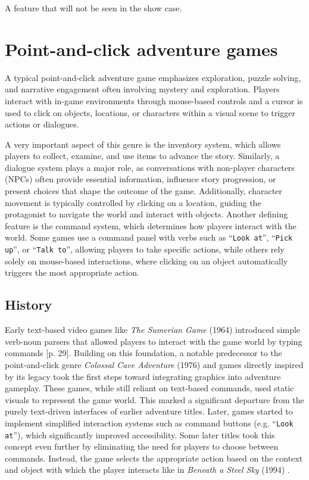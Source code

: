 
\begin{notImplemented}
 \par
\vspace{3mm}
A feature that will not be seen in the show case.
\end{notImplemented}

\section{Point-and-click adventure games}
A typical point-and-click adventure game emphasizes exploration, puzzle solving, and narrative engagement often involving mystery and exploration. Players interact with in-game environments through mouse-based controls and a cursor is used to click on objects, locations, or characters within a visual scene to trigger actions or dialogues. 

A very important aspect of this genre is the inventory system, which allows players to collect, examine, and use items to advance the story. Similarly, a dialogue system plays a major role, as conversations with non-player characters (NPCs) often provide essential information, influence story progression, or present choices that shape the outcome of the game. Additionally, character movement is typically controlled by clicking on a location, guiding the protagonist to navigate the world and interact with objects. Another defining feature is the command system, which determines how players interact with the world. Some games use a command panel with verbs such as “\texttt{Look at}”, “\texttt{Pick up}”, or “\texttt{Talk to}”, allowing players to take specific actions, while others rely solely on mouse-based interactions, where clicking on an object automatically triggers the most appropriate action. 

\subsection{History}
Early text-based video games like \textit{The Sumerian Game} (1964) introduced simple verb-noun parsers that allowed players to interact with the game world by typing commands \cite{Salter2014}[p. 29]. Building on this foundation, a notable predecessor to the point-and-click genre \textit{Colossal Cave Adventure} (1976) and games directly inspired by its legacy took the first steps toward integrating graphics into adventure gameplay. These games, while still reliant on text-based commands, used static visuals to represent the game world. This marked a significant departure from the purely text-driven interfaces of earlier adventure titles. Later, games started to implement simplified interaction systems such as command buttons (e.g. “\texttt{Look at}”), which significantly improved accessibility. Some later titles took this concept even further by eliminating the need for players to choose between commands. Instead, the game selects the appropriate action based on the context and object with which the player interacts like in \textit{Beneath a Steel Sky} (1994) \cite{Carton2023history}.

